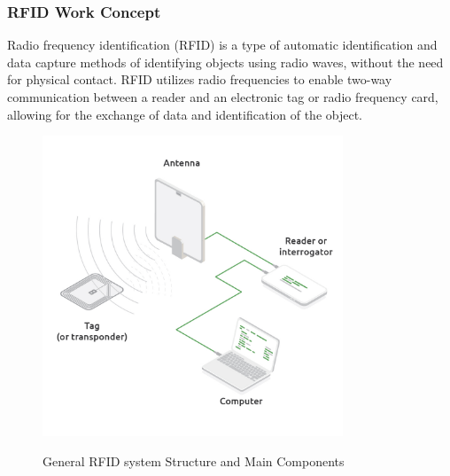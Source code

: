 \subsubsection{RFID Work Concept}
Radio frequency identification (RFID) is a type of automatic identification and data capture methods of identifying objects  using radio waves, without the need for physical contact. RFID utilizes radio frequencies to enable two-way communication between a reader and an electronic tag or radio frequency card, allowing for the exchange of data and identification of the object.\cite{li2018flooding}\cite{landaluce2020review}\\

\begin{figure}[h]
	\centering
	\includegraphics[width=0.8\textwidth,height=0.3\textheight]{images chap1/r}
	\caption{General RFID system Structure and Main Components }\cite{rfidwork}
\end{figure}

